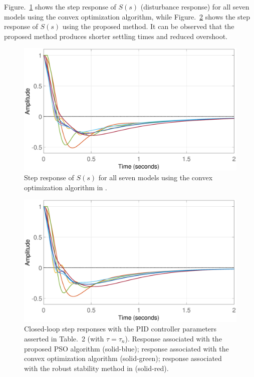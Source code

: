 \documentclass[letterpaper, 10 pt, conference]{ieeeconf}  %
\begin{document}
Figure.~\ref{fig:ex3_1} shows the step response of $S(s)$ (disturbance response) for all seven models using the convex optimization algorithm, while Figure.~\ref{fig:ex3_2} shows the step response of $S(s)$ using the proposed method. It can be observed that the proposed method produces shorter settling times and reduced overshoot. 
\begin{figure}
\centering
\includegraphics[width=\columnwidth]{../pics/step_multi_convex.eps}
\caption{Step response of $S(s)$ for all seven models using the convex optimization algorithm in \cite{KNZ16}.}
\label{fig:ex3_1}
\end{figure}

\begin{figure}
\centering
\includegraphics[width=\columnwidth]{../pics/step_multi_optimal.eps}
\caption{Closed-loop step responses with the PID controller parameters asserted in Table.~2 (with $\tau = \tau_n$). Response associated with the proposed PSO algorithm (solid-blue); response associated with the convex optimization algorithm (solid-green); response associated with the robust stability method in \cite{EW09} (solid-red).}
\label{fig:ex3_2}
\end{figure}
\end{document}
